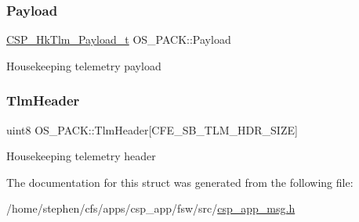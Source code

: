 \subsubsection{\texorpdfstring{Payload}{Payload}}
{\footnotesize\ttfamily \hyperlink{structCSP__HkTlm__Payload__t}{C\+S\+P\+\_\+\+Hk\+Tlm\+\_\+\+Payload\+\_\+t} O\+S\+\_\+\+P\+A\+C\+K\+::\+Payload}

Housekeeping telemetry payload \mbox{\label{structOS__PACK_a1c4c26522f6f0f8d81db9e32929e93f7}} 
\subsubsection{\texorpdfstring{Tlm\+Header}{TlmHeader}}
{\footnotesize\ttfamily uint8 O\+S\+\_\+\+P\+A\+C\+K\+::\+Tlm\+Header\mbox{[}C\+F\+E\+\_\+\+S\+B\+\_\+\+T\+L\+M\+\_\+\+H\+D\+R\+\_\+\+S\+I\+ZE\mbox{]}}

Housekeeping telemetry header 

The documentation for this struct was generated from the following file\+:\begin{DoxyCompactItemize}
\item 
/home/stephen/cfs/apps/csp\+\_\+app/fsw/src/\hyperlink{csp__app__msg_8h}{csp\+\_\+app\+\_\+msg.\+h}\end{DoxyCompactItemize}
